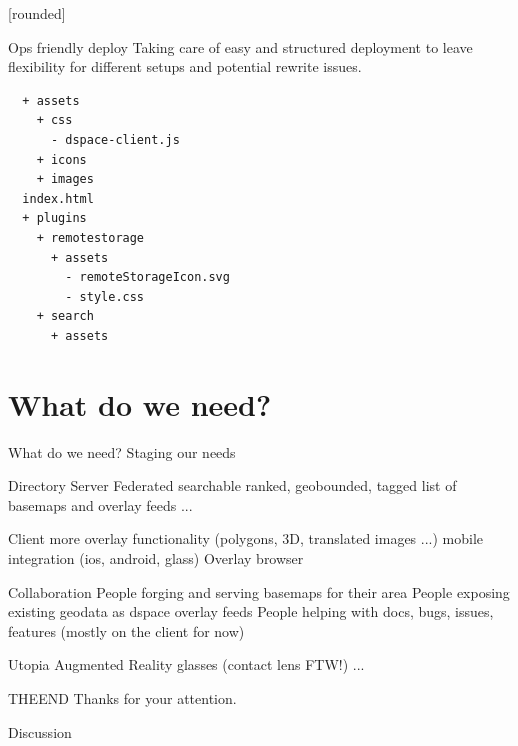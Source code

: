 \documentclass{beamer}
\newcommand\Fontvi{\fontsize{6}{7.2}\selectfont}
\begin{document}
[rounded]
\begin{frame}[fragile]{Ops friendly deploy}
Taking care of easy and structured deployment to leave flexibility for
different setups and potential rewrite issues.
\linebreak
\Fontvi
{}
\begin{block}{}
\begin{lstlisting}
  + assets
    + css
      - dspace-client.js
    + icons
    + images
  index.html
  + plugins
    + remotestorage
      + assets
        - remoteStorageIcon.svg
        - style.css
    + search
      + assets
\end{lstlisting}
\end{block}
\end{frame}



\section{What do we need?}

\begin{frame}{What do we need?}
 Staging our needs
\end{frame}

\begin{frame}{Directory Server}
 Federated searchable ranked, geobounded, tagged list of basemaps and overlay feeds
 ...
\end{frame}

\begin{frame}{Client}
 more overlay functionality (polygons, 3D, translated images ...)
 mobile integration (ios, android, glass)
 Overlay browser
\end{frame}

\begin{frame}{Collaboration}
 People forging and serving basemaps for their area
 People exposing existing geodata as dspace overlay feeds
 People helping with docs, bugs, issues, features (mostly on the client for now)
\end{frame}

\begin{frame}{Utopia}
 Augmented Reality glasses (contact lens FTW!)
 ...
\end{frame}

\begin{frame}{THEEND}
 Thanks for your attention.

 Discussion
\end{frame}
\end{document}
